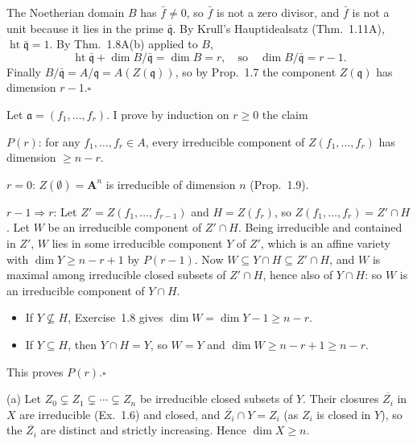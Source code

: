 \documentclass[11pt]{article}
\begin{document}
The Noetherian domain $B$ has $\bar f\neq0$, so $\bar f$ is not a zero divisor, and $\bar f$ is not a unit because it lies in the prime $\bar{\mathfrak q}$. By Krull's Hauptidealsatz (Thm.~1.11A), $\operatorname{ht}\bar{\mathfrak q}=1$. By Thm.~1.8A(b) applied to $B$,
\[
\operatorname{ht}\bar{\mathfrak q}+\dim B/\bar{\mathfrak q}=\dim B=r,\quad\text{so}\quad \dim B/\bar{\mathfrak q}=r-1.
\]
Finally $B/\bar{\mathfrak q}=A/\mathfrak q=A(Z(\mathfrak q))$, so by Prop.~1.7 the component $Z(\mathfrak q)$ has dimension $r-1$.\hfill$\square$

\pf
Let $\mathfrak a=(f_1,\dots,f_r)$. I prove by induction on $r\ge0$ the claim

\smallskip
$P(r)$: for any $f_1,\dots,f_r\in A$, every irreducible component of $Z(f_1,\dots,f_r)$ has dimension $\ge n-r$.

\smallskip
$r=0$: $Z(\emptyset)=\mathbf A^n$ is irreducible of dimension $n$ (Prop.~1.9).

$r-1\Rightarrow r$: Let $Z'=Z(f_1,\dots,f_{r-1})$ and $H=Z(f_r)$, so $Z(f_1,\dots,f_r)=Z'\cap H$. Let $W$ be an irreducible component of $Z'\cap H$. Being irreducible and contained in $Z'$, $W$ lies in some irreducible component $Y$ of $Z'$, which is an affine variety with $\dim Y\ge n-r+1$ by $P(r-1)$. Now $W\subseteq Y\cap H\subseteq Z'\cap H$, and $W$ is maximal among irreducible closed subsets of $Z'\cap H$, hence also of $Y\cap H$: so $W$ is an irreducible component of $Y\cap H$.
\begin{itemize}
\item If $Y\not\subseteq H$, Exercise~1.8 gives $\dim W=\dim Y-1\ge n-r$.
\item If $Y\subseteq H$, then $Y\cap H=Y$, so $W=Y$ and $\dim W\ge n-r+1\ge n-r$.
\end{itemize}
This proves $P(r)$.\hfill$\square$

\pf
(a) Let $Z_0\subsetneq Z_1\subsetneq\cdots\subsetneq Z_n$ be irreducible closed subsets of $Y$. Their closures $\overline{Z_i}$ in $X$ are irreducible (Ex.~1.6) and closed, and $\overline{Z_i}\cap Y=Z_i$ (as $Z_i$ is closed in $Y$), so the $\overline{Z_i}$ are distinct and strictly increasing. Hence $\dim X\ge n$.
\end{document}
